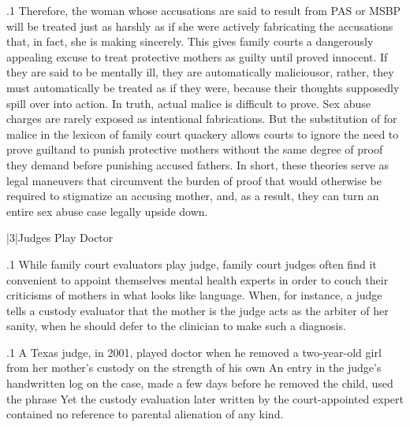 \documentclass[11pt, twoside]{article}
\begin{document}
{\p.1{%
Therefore, the woman whose accusations are said to result from PAS
or MSBP will be treated just as harshly as if she were actively fabricating
the accusations that, in fact, she is making sincerely.
This gives family courts a dangerously appealing excuse to treat protective mothers as guilty until proved innocent. If they are said to be
mentally ill, they are automatically malicious\mdash{}or, rather, they must automatically be treated as if they were, because their thoughts supposedly
spill over into action. In truth, actual malice is difficult to prove. Sex
abuse charges are rarely exposed as intentional fabrications. But the substitution of  for malice in the lexicon of family court
quackery allows courts to ignore the need to prove guilt\mdash{}and to punish protective mothers without the same degree of proof they demand
before punishing accused fathers. In short, these theories serve as legal
maneuvers that circumvent the burden of proof that would otherwise
be required to stigmatize an accusing mother, and, as a result, they can
turn an entire sex abuse case legally upside down.
}%


\s|3|{Judges Play Doctor}

\p.1{%
\noindent{}While family court evaluators play judge, family court judges often find
it convenient to appoint themselves mental health experts in order to couch their
criticisms of mothers in what looks like  language.
When, for instance, a judge tells a custody evaluator that the mother
is  the judge acts as the arbiter of her sanity, when he should defer
to the clinician to make such a diagnosis.
}%

\p.1{%
A Texas judge, in 2001, played doctor when he removed a
two-year-old girl from her mother’s custody on the strength of his own 
An entry in the judge’s handwritten log on the case, made a few days
before he removed the child, used the phrase 
Yet the custody evaluation later written by the court-appointed expert
contained no reference to parental alienation of any kind.
}%

}
\end{document}
